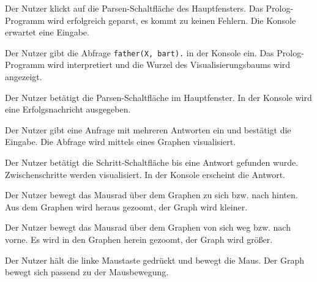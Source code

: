 \documentclass[parskip=full,11pt,twoside]{scrartcl}
\begin{document}
{Der Nutzer klickt auf die Parsen-Schaltfläche des Hauptfensters.}
{Das Prolog-Programm wird erfolgreich geparst, es kommt zu keinen Fehlern. Die Konsole erwartet eine Eingabe.}

{Der Nutzer gibt die Abfrage \texttt{father(X, bart).} in der Konsole ein.}
{Das Prolog-Programm wird interpretiert und die Wurzel des Visualisierungsbaums wird angezeigt.}



{Der Nutzer betätigt die Parsen-Schaltfläche im Hauptfenster.}
{In der Konsole wird eine Erfolgsnachricht ausgegeben.}

{Der Nutzer gibt eine Anfrage mit mehreren Antworten ein und bestätigt die Eingabe.}
{Die Abfrage wird mittels eines Graphen visualisiert.}

{Der Nutzer betätigt die Schritt-Schaltfläche bis eine Antwort gefunden wurde.}
{Zwischenschritte werden visualisiert. In der Konsole erscheint die Antwort.}



{Der Nutzer bewegt das Mausrad über dem Graphen zu sich bzw. nach hinten.}
{Aus dem Graphen wird heraus gezoomt, der Graph wird kleiner.}

{Der Nutzer bewegt das Mausrad über dem Graphen von sich weg bzw. nach vorne.}
{Es wird in den Graphen herein gezoomt, der Graph wird größer.}



{Der Nutzer hält die linke Maustaste gedrückt und bewegt die Maus.}
{Der Graph bewegt sich passend zu der Mausbewegung.}
\end{document}
